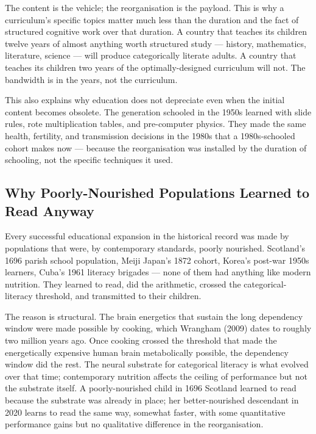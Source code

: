 \documentclass[12pt,letterpaper]{article}
\begin{document}
The content is the vehicle; the reorganisation is the payload. This
is why a curriculum's specific topics matter much less than the
duration and the fact of structured cognitive work over that
duration. A country that teaches its children twelve years of almost
anything worth structured study --- history, mathematics, literature,
science --- will produce categorically literate adults. A country
that teaches its children two years of the optimally-designed
curriculum will not. The bandwidth is in the years, not the curriculum.

This also explains why education does not depreciate even when the
initial content becomes obsolete. The generation schooled in the
1950s learned with slide rules, rote multiplication tables, and
pre-computer physics. They made the same health, fertility, and
transmission decisions in the 1980s that a 1980s-schooled cohort
makes now --- because the reorganisation was installed by the
duration of schooling, not the specific techniques it used.

\subsection{Why Poorly-Nourished Populations Learned to Read Anyway}\label{why-poorly-nourished-populations-learned-to-read}

Every successful educational expansion in the historical record was
made by populations that were, by contemporary standards, poorly
nourished. Scotland's 1696 parish school population, Meiji Japan's
1872 cohort, Korea's post-war 1950s learners, Cuba's 1961 literacy
brigades --- none of them had anything like modern nutrition. They
learned to read, did the arithmetic, crossed the categorical-literacy
threshold, and transmitted to their children.

The reason is structural. The brain energetics that sustain the long
dependency window were made possible by cooking, which Wrangham
(2009) dates to roughly two million years ago. Once cooking crossed
the threshold that made the energetically expensive human brain
metabolically possible, the dependency window did the rest. The
neural substrate for categorical literacy is what evolved over that
time; contemporary nutrition affects the ceiling of performance but
not the substrate itself. A poorly-nourished child in 1696 Scotland
learned to read because the substrate was already in place; her
better-nourished descendant in 2020 learns to read the same way,
somewhat faster, with some quantitative performance gains but no
qualitative difference in the reorganisation.
\end{document}
